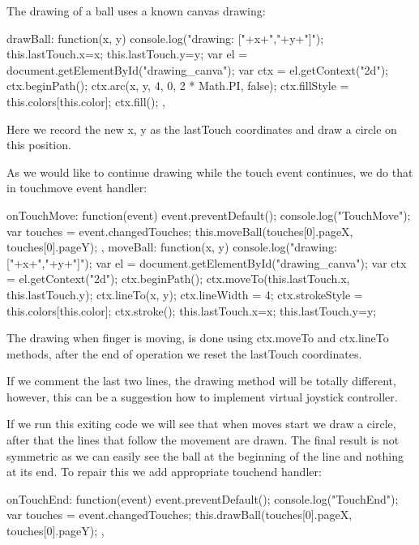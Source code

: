 The drawing of a ball uses a known canvas drawing:

\begin{js}
    drawBall: function(x, y){
		console.log("drawing: ["+x+","+y+"]");
		this.lastTouch.x=x;
		this.lastTouch.y=y;
		var el = document.getElementById("drawing_canva");
		var ctx = el.getContext("2d");
		ctx.beginPath();
		ctx.arc(x, y, 4, 0, 2 * Math.PI, false);
		ctx.fillStyle = this.colors[this.color];
		ctx.fill();
	},
\end{js}

\begin{explain}
Here we record the new x, y as the lastTouch coordinates and draw a circle on this position.
\end{explain}

As we would like to continue drawing while the touch event continues, we do that in touchmove event handler:

\begin{js}
    onTouchMove: function(event){
		event.preventDefault();
		console.log("TouchMove");
		var touches = event.changedTouches;
		this.moveBall(touches[0].pageX, touches[0].pageY);
	},
    moveBall: function(x, y){
		console.log("drawing: ["+x+","+y+"]");
		var el = document.getElementById("drawing_canva");
		var ctx = el.getContext("2d");
		ctx.beginPath();
		ctx.moveTo(this.lastTouch.x, this.lastTouch.y);
		ctx.lineTo(x, y);
		ctx.lineWidth = 4;
		ctx.strokeStyle = this.colors[this.color];
		ctx.stroke();
		this.lastTouch.x=x;
		this.lastTouch.y=y;
	}
\end{js}

\begin{explain}
The drawing when finger is moving, is done using ctx.moveTo and ctx.lineTo methods, after the end of operation we reset the lastTouch coordinates.
\begin{warning}
If we comment the last two lines, the drawing method will be totally different, however, this can be a suggestion how to implement virtual joystick controller.
\end{warning}
\end{explain}

If we run this exiting code we will see that when moves start we draw a circle, after that the lines that follow the movement are drawn. The final result is not symmetric as we can easily see the ball at the beginning of the line and nothing at its end. To repair this we add appropriate touchend handler:

\begin{js}
    onTouchEnd: function(event){
		event.preventDefault();
		console.log("TouchEnd");
		var touches = event.changedTouches;
		this.drawBall(touches[0].pageX, touches[0].pageY);
	},
		
\end{js}


